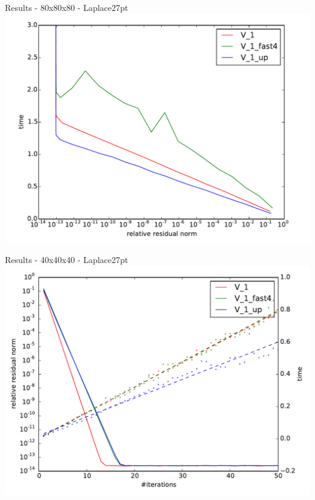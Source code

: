 \documentclass{beamer}
\begin{document}
\begin{frame}{Results - 80x80x80 - Laplace27pt}
 \includegraphics[width=\linewidth]{AMG2006/test/DELL/27pt/time_convergence_fast_10.pdf}
\end{frame}
\begin{frame}{Results - 40x40x40 - Laplace27pt}
 \includegraphics[width=\linewidth]{AMG2006/test/DELL/27pt/convergence_fast.pdf}
\end{frame}
\end{document}
